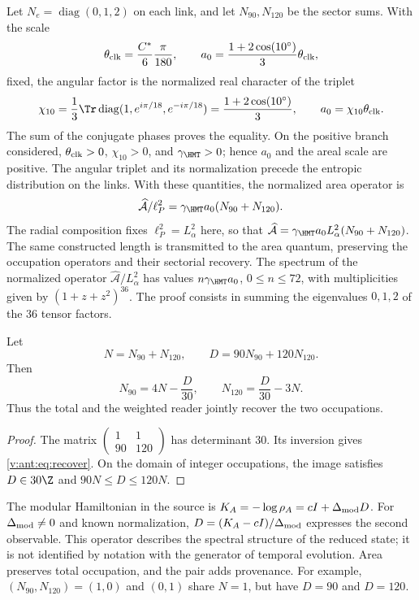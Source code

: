 Let $N_e=\operatorname{diag}(0,1,2)$ on each link, and let
$N_{90},N_{120}$ be the sector sums. With the scale
\[
\theta_{\rm clk}=\frac{C^*}{6}\frac{\pi}{180},\qquad
a_0=\frac{1+2\cos(10^\circ)}3\theta_{\rm clk},
\]
fixed, the angular factor is the normalized real character of the triplet
\begin{equation}
 \chi_{10}=\frac13\Tr\operatorname{diag}
       (1,e^{i\pi/18},e^{-i\pi/18})
 =\frac{1+2\cos(10^\circ)}3,
 \qquad a_0=\chi_{10}\theta_{\rm clk}.
 \label{v:ant:eq:ii-area-caracter-triplete}
\end{equation}
The sum of the conjugate phases proves the equality. On the positive branch
considered, \(\theta_{\rm clk}>0\), \(\chi_{10}>0\), and
\(\gamma_{\HMT}>0\); hence \(a_0\) and the areal scale are
positive. The angular triplet and its normalization precede the
entropic distribution on the links. With these quantities,
the normalized area operator is
\[
\widehat{\mathcal A}/\ell_P^2
=\gamma_{\HMT}a_0(N_{90}+N_{120}).
\]
The radial composition fixes \(\ell_P^2=L_\alpha^2\) here, so that
\(\widehat{\mathcal A}=\gamma_{\HMT}a_0L_\alpha^2(N_{90}+N_{120})\).
The same constructed length is transmitted to the area quantum, preserving
the occupation operators and their sectorial recovery.
The spectrum of the normalized operator \(\widehat{\mathcal A}/L_\alpha^2\)
has values $n\gamma_{\HMT}a_0$, $0\le n\le72$,
with multiplicities given by $(1+z+z^2)^{36}$.
The proof consists in summing the eigenvalues $0,1,2$ of the
36 tensor factors.

\begin{theorem}
Let
\[
N=N_{90}+N_{120},\qquad D=90N_{90}+120N_{120}.
\]
Then
\begin{equation}
N_{90}=4N-\frac D{30},\qquad
N_{120}=\frac D{30}-3N.
\label{v:ant:eq:recover}
\end{equation}
Thus the total and the weighted reader jointly recover
the two occupations.
\end{theorem}
\begin{proof}
The matrix $\left(\begin{smallmatrix}1&1\\90&120\end{smallmatrix}\right)$
has determinant $30$. Its inversion gives \eqref{v:ant:eq:recover}.
On the domain of integer occupations, the image satisfies
$D\in30\Z$ and $90N\le D\le120N$.
\end{proof}

The modular Hamiltonian in the source is
$K_A=-\log\rho_A=cI+\Delta_{\rm mod}D$.
For $\Delta_{\rm mod}\ne0$ and known normalization,
$D=(K_A-cI)/\Delta_{\rm mod}$ expresses the second observable.
This operator describes the spectral structure of the reduced state;
it is not identified by notation with the generator of temporal evolution.
Area preserves total occupation, and the pair adds provenance.
For example, $(N_{90},N_{120})=(1,0)$ and $(0,1)$ share $N=1$,
but have $D=90$ and $D=120$.

